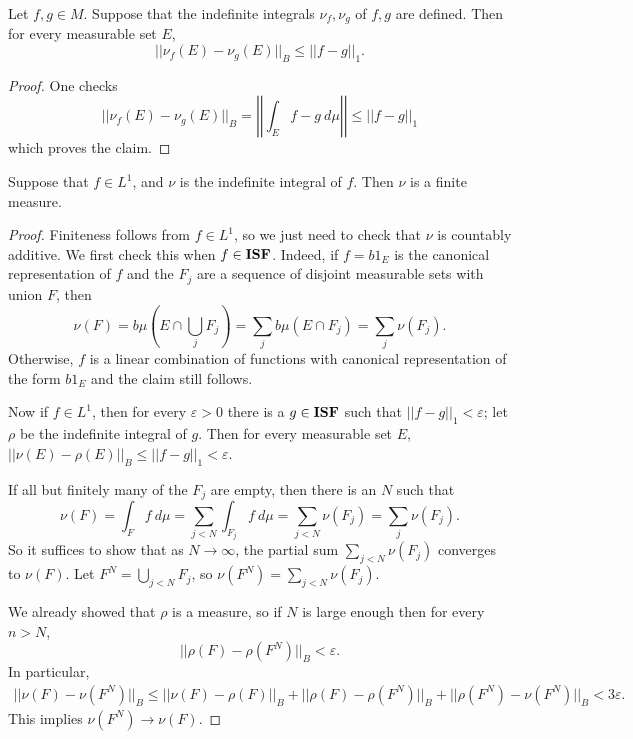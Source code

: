 \begin{lemma}
Let $f,g \in M$. Suppose that the indefinite integrals $\nu_{f},\nu_{g}$ of $f,g$ are defined. Then for every measurable set $E$,
\[||\nu_{f}(E) - \nu_{g}(E)||_{B} \leq ||f - g||_{1}.\]
\end{lemma}
\begin{proof}
One checks
\[||\nu_{f}(E) - \nu_{g}(E)||_{B} = \left|\left| \int_{E} f - g ~d\mu\right|\right| \leq ||f - g||_{1}\]
which proves the claim.
\end{proof}

\begin{theorem}
Suppose that $f \in L^{1}$, and $\nu$ is the indefinite integral of $f$. Then $\nu$ is a finite measure.
\end{theorem}
\begin{proof}
Finiteness follows from $f \in L^{1}$, so we just need to check that $\nu$ is countably additive.
We first check this when $f \in \mathbf{ISF}$. Indeed, if $f = b1_{E}$ is the canonical representation of $f$ and the $F_{j}$ are a sequence of disjoint measurable sets with union $F$, then
\[\nu(F) = b\mu\left(E \cap \bigcup_{j} F_{j}\right) = \sum_{j} b\mu(E \cap F_{j}) = \sum_{j} \nu(F_{j}).\]
Otherwise, $f$ is a linear combination of functions with canonical representation of the form $b1_{E}$ and the claim still follows.

Now if $f \in L^{1}$, then for every $\varepsilon > 0$ there is a $g \in \mathbf{ISF}$ such that $||f - g||_{1} < \varepsilon$; let $\rho$ be the indefinite integral of $g$. Then for every measurable set $E$, $||\nu(E) - \rho(E)||_{B} \leq ||f - g||_{1} < \varepsilon$.

If all but finitely many of the $F_{j}$ are empty, then there is an $N$ such that
\[\nu(F) = \int_{F} f ~d\mu = \sum_{j<N} \int_{F_{j}} f~d\mu = \sum_{j<N} \nu(F_{j}) = \sum_{j} \nu(F_{j}).\]
So it suffices to show that as $N \to \infty$, the partial sum $\sum_{j<N} \nu(F_{j})$ converges to $\nu(F)$.
Let $F^{N} = \bigcup_{j<N} F_{j}$, so $\nu(F^{N}) = \sum_{j<N} \nu(F_{j})$.

We already showed that $\rho$ is a measure, so if $N$ is large enough then for every $n > N$,
\[||\rho(F) - \rho(F^{N})||_{B} < \varepsilon.\]
In particular,
\begin{align*}
||\nu(F) - \nu(F^{N})||_{B} \leq ||\nu(F) - \rho(F)||_{B} + ||\rho(F) - \rho(F^{N})||_{B} + ||\rho(F^{N}) - \nu(F^{N})||_{B} < 3\varepsilon.
\end{align*}
This implies $\nu(F^{N}) \to \nu(F)$.
\end{proof}

